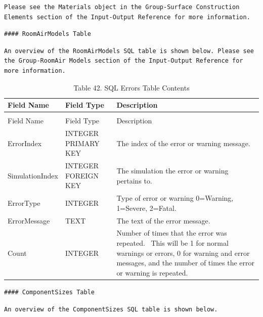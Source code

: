 \begin{lstlisting}
Please see the Materials object in the Group-Surface Construction Elements section of the Input-Output Reference for more information.
\end{lstlisting}

\begin{lstlisting}
#### RoomAirModels Table
\end{lstlisting}

\begin{lstlisting}
An overview of the RoomAirModels SQL table is shown below. Please see the Group-RoomAir Models section of the Input-Output Reference for more information.
\end{lstlisting}

\begin{longtable}[c]{p{1.5in}p{1.5in}p{2.99in}}
\caption{Table 42. SQL Errors Table Contents \label{table:table-42.-sql-errors-table-contents}} \tabularnewline
\toprule 
Field Name & Field Type & Description \tabularnewline
\midrule
\endfirsthead

\caption[]{Table 42. SQL Errors Table Contents} \tabularnewline
\toprule 
Field Name & Field Type & Description \tabularnewline
\midrule
\endhead

ErrorIndex & INTEGER PRIMARY KEY & The index of the error or warning message. \tabularnewline
SimulationIndex & INTEGER FOREIGN KEY & The simulation the error or warning pertains to. \tabularnewline
ErrorType & INTEGER & Type of error or warning 0=Warning, 1=Severe, 2=Fatal. \tabularnewline
ErrorMessage & TEXT & The text of the error message. \tabularnewline
Count & INTEGER & Number of times that the error was repeated.~ This will be 1 for normal warnings or errors, 0 for warning and error messages, and the number of times the error or warning is repeated. \tabularnewline
\bottomrule
\end{longtable}

\begin{lstlisting}
#### ComponentSizes Table
\end{lstlisting}

\begin{lstlisting}
An overview of the ComponentSizes SQL table is shown below.
\end{lstlisting}


